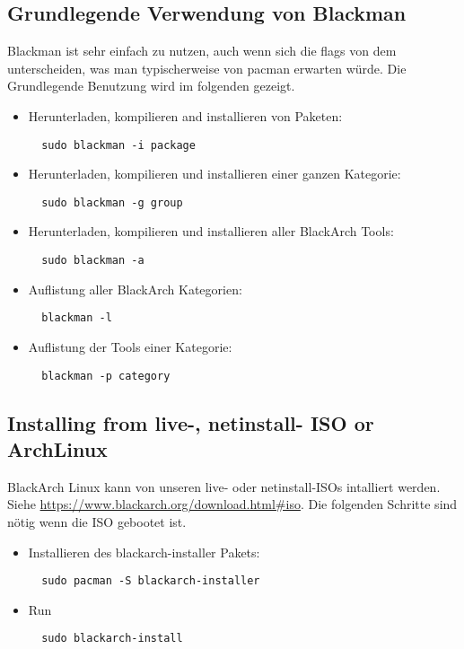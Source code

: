 \documentclass[a4paper, oneside, 11pt]{book}
\begin{document}
\subsection{Grundlegende Verwendung von Blackman} Blackman ist sehr einfach zu nutzen, auch wenn sich die flags von dem unterscheiden, was man typischerweise von pacman erwarten würde. 
Die Grundlegende Benutzung wird im folgenden gezeigt.
\begin{itemize}
\item Herunterladen, kompilieren and installieren von Paketen:
\begin{lstlisting}
  sudo blackman -i package
\end{lstlisting}

\item Herunterladen, kompilieren und installieren einer ganzen Kategorie:
\begin{lstlisting}
  sudo blackman -g group
\end{lstlisting}

\item Herunterladen, kompilieren und installieren aller BlackArch Tools:
\begin{lstlisting}
  sudo blackman -a
\end{lstlisting}

\item Auflistung aller BlackArch Kategorien:
\begin{lstlisting}
  blackman -l
\end{lstlisting}

\item Auflistung der Tools einer Kategorie:
\begin{lstlisting}
  blackman -p category
\end{lstlisting}

\end{itemize}

\subsection{Installing from live-, netinstall- ISO or ArchLinux}
BlackArch Linux kann von unseren live- oder netinstall-ISOs intalliert werden. \\Siehe
\url{https://www.blackarch.org/download.html#iso}. Die folgenden Schritte sind nötig wenn die ISO gebootet ist.
\begin{itemize}
\item Installieren des blackarch-installer Pakets:
\begin{lstlisting}
  sudo pacman -S blackarch-installer
\end{lstlisting}

\item Run
\begin{lstlisting}
  sudo blackarch-install
\end{lstlisting}

\end{itemize}
\end{document}
